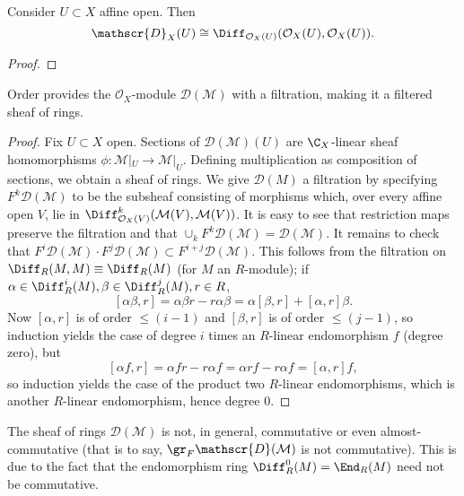 \begin{lemma}
    Consider $U\subset X$ affine open. Then
    \[\mathscr{D}_X(U)\cong\Diff_{\mathcal{O}_X(U)}(\mathcal{O}_X(U),\mathcal{O}_X(U)).\]
    \label{lem:affine1}
\end{lemma}
\begin{proof}
\end{proof}

\begin{lemma}
    Order provides the $\mathcal{O}_X$-module $\mathscr{D}(\mathcal{M})$ with
    a filtration, making it a filtered sheaf of rings.
    \label{lem:filter1}
\end{lemma}
\begin{proof}
    Fix $U\subset X$ open. Sections of $\mathscr{D}(\mathcal{M})(U)$ are $\C_X$-linear
    sheaf homomorphisms $\phi:\mathcal{M}|_U\to\mathcal{M}|_U$. Defining multiplication as composition
    of sections, we obtain a sheaf of rings. We give $\mathscr{D}(M)$ a filtration by specifying
    $F^k\mathscr{D}(\mathcal{M})$ to be the subsheaf consisting of morphisms which, over every affine
    open $V$, lie in $\Diff^k_{\mathcal{O}_X(V)}(\mathcal{M}(V),\mathcal{M}(V))$. It is easy to see
    that restriction maps preserve the filtration and that $\cup_kF^k\mathscr{D}(\mathcal{M})=\mathscr{D}(\mathcal{M})$.
    It remains to check that
    $F^i\mathscr{D}(\mathcal{M})\cdot F^j\mathscr{D}(\mathcal{M})\subset F^{i+j}\mathscr{D}(\mathcal{M})$.
    This follows from the filtration on $\Diff_R(M,M)\equiv\Diff_R(M)$ (for $M$ an $R$-module);
    if $\alpha\in\Diff^i_R(M),\beta\in\Diff^j_R(M),r\in R$,
    \[ [\alpha\beta,r] = \alpha\beta r-r\alpha\beta = \alpha[\beta,r] +[\alpha,r]\beta.  \]
    Now $[\alpha,r]$ is of order $\leqslant (i-1)$ and $[\beta,r]$ is of order $\leqslant(j-1)$, so induction
    yields the case of degree $i$ times an $R$-linear endomorphism $f$ (degree zero), but
    \[ [\alpha f, r]=\alpha fr-r\alpha f=\alpha rf-r\alpha f=[\alpha,r]f, \]
    so induction yields the case of the product two $R$-linear endomorphisms, which is another
    $R$-linear endomorphism, hence degree $0$.
\end{proof}

\begin{remark}
    The sheaf of rings $\mathscr{D}(\mathcal{M})$ is not, in general, commutative or even
    almost-commutative (that is to say, $\gr_F \mathscr{D}(\mathcal{M})$ is not commutative).
    This is due to the fact that the endomorphism ring $\Diff_R^0(M)=\End_R(M)$ need not be
    commutative.
\end{remark}

